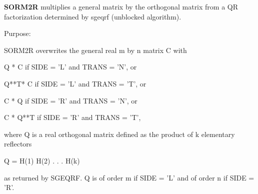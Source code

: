 {\bfseries S\+O\+R\+M2\+R} multiplies a general matrix by the orthogonal matrix from a Q\+R factorization determined by sgeqrf (unblocked algorithm). 

 \begin{DoxyParagraph}{Purpose\+: }
\begin{DoxyVerb} SORM2R overwrites the general real m by n matrix C with

       Q * C  if SIDE = 'L' and TRANS = 'N', or

       Q**T* C  if SIDE = 'L' and TRANS = 'T', or

       C * Q  if SIDE = 'R' and TRANS = 'N', or

       C * Q**T if SIDE = 'R' and TRANS = 'T',

 where Q is a real orthogonal matrix defined as the product of k
 elementary reflectors

       Q = H(1) H(2) . . . H(k)

 as returned by SGEQRF. Q is of order m if SIDE = 'L' and of order n
 if SIDE = 'R'.\end{DoxyVerb}
 
\end{DoxyParagraph}

